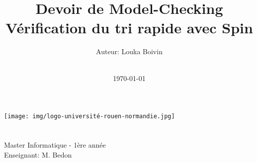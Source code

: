 \title{\Huge Devoir de Model-Checking  \\[0.5cm]
        \bf\Huge Vérification du tri rapide avec Spin}
\author{\Large Auteur: Louka Boivin\\ \ \\}
\date{\Large \today}

\makeatletter
    \begin{titlepage}
        \begin{center}
	   { \texttt{[image: img/logo-université-rouen-normandie.jpg]}}
	   {\ \\ \ \\}
        \vbox{}\vspace{3cm}
            {\@title }
            {\\[0.5cm]\huge Master Informatique - 1ère année}\\[3cm] 
            {\@author}
            {\Large Enseignant: M. Bedon\\ \ \\}
            {\@date\\}
        \end{center}
    \end{titlepage}
\makeatother
